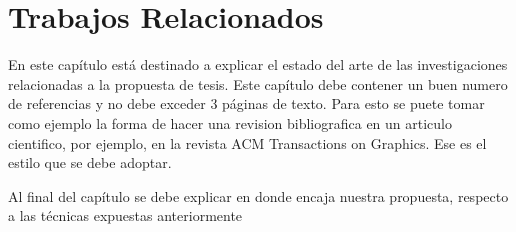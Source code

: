 \chapter{Trabajos Relacionados}
En este capítulo está destinado a explicar el estado del arte de las investigaciones relacionadas a la propuesta de tesis.
Este capítulo debe contener un buen numero de referencias y no debe exceder 3 páginas de texto. Para esto se puete tomar como ejemplo la forma de hacer una revision bibliografica en un articulo cientifico, por ejemplo, en la revista ACM Transactions on Graphics. Ese es el estilo que se debe adoptar.

Al final del capítulo se debe explicar en donde encaja nuestra propuesta, respecto a las técnicas expuestas anteriormente